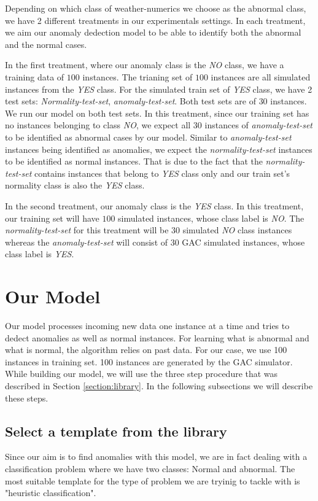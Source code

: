 \documentclass[conference]{IEEEtran}
\begin{document}
Depending on which class of weather-numerics we choose as the abnormal class, we have 2 different treatments in our experimentals settings.
In each treatment, we aim our anomaly dedection model to be able to identify both the abnormal and the normal cases.

In the first treatment, where our anomaly class is the \textit{NO} class, we have a training data of $100$ instances.
The trianing set of $100$ instances are all simulated instances from the \textit{YES} class.
For the simulated train set of \textit{YES} class, we have 2 test sets: \textit{Normality-test-set}, \textit{anomaly-test-set}.
Both test sets are of $30$ instances.
We run our model on both test sets.
In this treatment, since our training set has no instances belonging to class \textit{NO}, we expect all $30$ instances of \textit{anomaly-test-set} to be identified as abnormal cases by our model.
Similar to \textit{anomaly-test-set} instances being identified as anomalies, we expect the \textit{normality-test-set} instances to be identified as normal instances.
That is due to the fact that the \textit{normality-test-set} contains instances that belong to \textit{YES} class only and our train set's normality class is also the \textit{YES} class.

In the second treatment, our anomaly class is the \textit{YES} class.
In this treatment, our training set will have $100$ simulated instances, whose class label is \textit{NO}.
The \textit{normality-test-set} for this treatment will be $30$ simulated \textit{NO} class instances whereas the \textit{anomaly-test-set} will consist of $30$ GAC simulated instances, whose class label is \textit{YES}.

\section{Our Model}

Our model processes incoming new data one instance at a time and tries to dedect anomalies as well as normal instances.
For learning what is abnormal and what is normal, the algorithm relies on past data.
For our case, we use 100 instances in training set.
100 instances are generated by the GAC simulator.
While building our model, we will use the three step procedure that was described in Section \ref{section:library}.
In the following subsections we will describe these steps.

\subsection{Select a template from the library}
Since our aim is to find anomalies with this model, we are in fact dealing with a classification problem where we have two classes: Normal and abnormal.
The most suitable template for the type of problem we are tryinig to tackle with is "heuristic classification".
\end{document}
